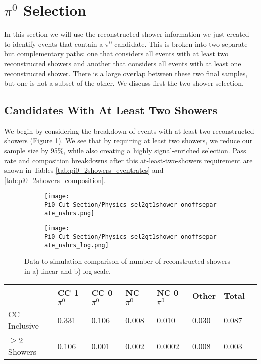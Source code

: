 \clearpage
\section{$\pi^0$ Selection} 

In this section we will use the reconstructed shower information we just created to identify events that contain a $\pi^0$ candidate. This is broken into two separate but complementary paths: one that considers all events with at least two reconstructed showers and another that considers all events with at least one reconstructed shower. There is a large overlap between these two final samples, but one is not a subset of the other. We discuss first the two shower selection.  

\subsection{Candidates With At Least Two Showers}
We begin by considering the breakdown of events with at least two reconstructed showers (Figure \ref{fig:physics_pi0_nshrs}).  We see that by requiring at least two showers, we reduce our sample size by 95\%, while also creating a highly signal-enriched selection. Pass rate and composition breakdowns after this at-least-two-showers requirement are shown in Tables \ref{tab:pi0_2showers_eventrates} and \ref{tab:pi0_2showers_composition}. 

\begin{figure}[H]
  \begin{subfigure}[t]{0.3\textwidth}
\texttt{[image: Pi0\_Cut\_Section/Physics\_sel2gt1shower\_onoffseparate\_nshrs.png]}
  \caption{ }
  \end{subfigure} 
  \hspace{30mm}
  \begin{subfigure}[t]{0.3\textwidth}
    \texttt{[image: Pi0\_Cut\_Section/Physics\_sel2gt1shower\_onoffseparate\_nshrs\_log.png]}
  \caption{ }
  \end{subfigure} 
\caption{ Data to simulation comparison of number of reconstructed showers in a) linear and b) log scale. }
\label{fig:physics_pi0_nshrs}
\end{figure}

\begin{table}[H]
\centering
{}
 \begin{tabular}{| l | l | l |l|l|l|l|l|}
 \hline
 & CC 1$\pi^0$ & CC 0$\pi^0$ & NC $\pi^0$ & NC 0$\pi^0$ & Other & Total \\ [0.1ex] \hline
CC Inclusive & 0.331 & 0.106 & 0.008 & 0.010 & 0.030 & 0.087 \\
$\geq$2 Showers & 0.106 & 0.001 & 0.002 & 0.0002 & 0.008 & 0.003 \\ \hline
\end{tabular}
\end{table}

